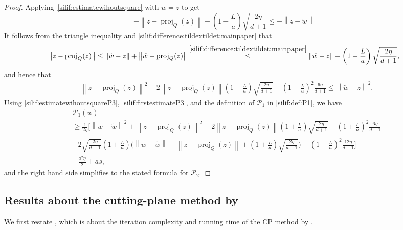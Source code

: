 \documentclass[11pt,letterpaper]{article}
\newcommand{\norm}[1]{\left\lVert #1 \right\rVert}
\newcommand{\proj}{\operatorname{proj}}
\newcommand{\brac}[1]{\left( #1\right)}
\begin{document}
\begin{proof}
Applying~\eqref{silif:estimatewihoutsquare} with $w=z$ to get
\begin{equation}
\label{silif:estimatewihoutsquareP3}
    -\norm{z-\proj_Q\brac{z}}-\brac{1+\frac{L}{a}}\sqrt{\frac{2\eta}{d+1}}\leq -\norm{z-\tilde{w}}
\end{equation}
It follows from the triangle inequality and \eqref{silif:difference:tildextildet:mainpaper} that
\[
\norm{z-\proj_Q(z)}\leq \norm{\tilde{w} -z} +\norm{\tilde{w}-\proj_Q(z)}\stackrel{\eqref{silif:difference:tildextildet:mainpaper}}{\leq} \norm{\tilde{w} -z} +\brac{1+\frac{L}{a}}\sqrt{\frac{2\eta}{d+1}},
\]
and hence that
\begin{align}
\label{silif:firstestimateP3}
    &\norm{z-\proj_Q(z)}^2-2\norm{z-\proj_Q(z)}\brac{1+\frac{L}{a}}\sqrt{\frac{2\eta}{d+1}}-\brac{1+\frac{L}{a}}^2\frac{6\eta}{d+1}\leq \norm{\tilde{w}-z}^2. 
\end{align}
Using \eqref{silif:estimatewihoutsquareP3}, \eqref{silif:firstestimateP3}, and the definition of $\mathcal{P}_1$ in \eqref{silif:def:P1}, we have
\begin{align*}
    &\mathcal{P}_1(w)\\
    &\geq \frac{1}{2\eta}\Bigg[\norm{w - \tilde{w}}^2 + \norm{z-\proj_Q(z)}^2-2\norm{z-\proj_Q(z)}\brac{1+\frac{L}{a}}\sqrt{\frac{2\eta}{d+1}} -\brac{1+\frac{L}{a}}^2\frac{6\eta}{d+1} \\
    &-2\sqrt{\frac{2\eta}{d+1}}\brac{1+\frac{L}{a}} \bigg(\norm{w-\tilde{w}} + \norm{z-\proj_Q\brac{z}}+\brac{1+\frac{L}{a}}\sqrt{\frac{2\eta}{d+1}}\bigg) -\brac{1+\frac{L}{a}}^2\frac{12\eta}{d+1}\Bigg] \\
    & - \frac{a^2\eta}{2} + a s,
\end{align*}
and the right hand side simplifies to the stated formula for $\mathcal{P}_2$. 
\end{proof}


\subsection{Results about the cutting-plane method by \cite{jiang2020cuttingplane}}
\label{silif:appen:cp}

We first restate \cite[Theorem~C.1]{jiang2020cuttingplane}, which is about the iteration complexity and running time of the CP method by \cite{jiang2020cuttingplane}. 
\end{document}
